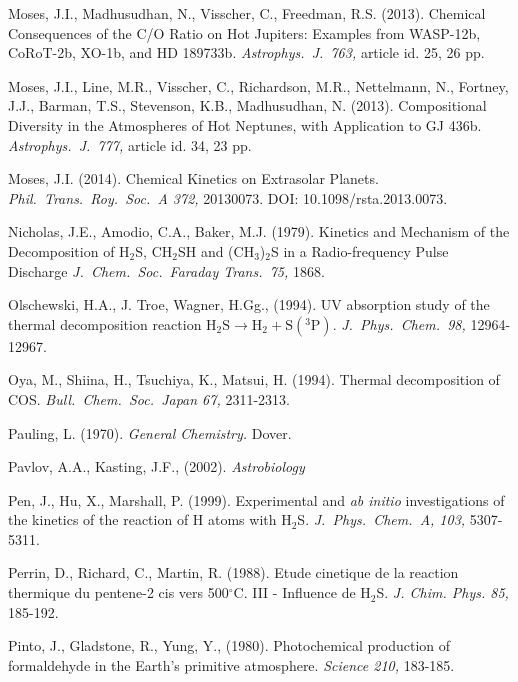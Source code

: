 \documentclass[preprint]{aastex6}
\newcounter{reaction}
\begin{document}
\begin{thebibliography}{00}
Moses, J.I., Madhusudhan, N., Visscher, C., Freedman, R.S. (2013).
Chemical Consequences of the C/O Ratio on Hot Jupiters: Examples from WASP-12b, CoRoT-2b, XO-1b, and HD 189733b.
{\em Astrophys.\ J.\ 763,} article id. 25, 26 pp.

Moses, J.I., Line, M.R., Visscher, C., Richardson, M.R., Nettelmann, N., Fortney, J.J., Barman, T.S., Stevenson, K.B., Madhusudhan, N. (2013).
Compositional Diversity in the Atmospheres of Hot Neptunes, with Application to GJ 436b.
{\em Astrophys.\ J.\ 777,} article id. 34, 23 pp.

 Moses, J.I. (2014).
 Chemical Kinetics on Extrasolar Planets. 
 {\em Phil.\ Trans.\ Roy.\ Soc.\ A 372,} 20130073. DOI: 10.1098/rsta.2013.0073.
 
 Nicholas, J.E., Amodio, C.A., Baker, M.J. (1979).
Kinetics and Mechanism of the Decomposition of H$_2$S, CH$_2$SH and (CH$_3$)$_2$S in a Radio-frequency Pulse Discharge
{\em J.\ Chem.\ Soc.\ Faraday Trans.\ 75,} 1868.
 
Olschewski, H.A., J. Troe, Wagner, H.Gg., (1994).
UV absorption study of the thermal decomposition reaction $\mathrm{H}_2\mathrm{S} \rightarrow \mathrm{H}_2 + \mathrm{S}(^3\mathrm{P})$.
{\em J.\ Phys.\ Chem.\ 98,} 12964-12967.
 
Oya, M., Shiina, H., Tsuchiya, K., Matsui, H. (1994).
Thermal decomposition of COS.
{\em Bull.\ Chem.\ Soc.\ Japan 67,} 2311-2313.

Pauling, L. (1970).
{\em General Chemistry.} Dover.

Pavlov, A.A., Kasting, J.F., (2002).
{\em Astrobiology}

Pen, J., Hu, X., Marshall, P. (1999). 
Experimental and {\it ab initio} investigations of the kinetics of the reaction of H atoms with H$_2$S.
{\em J.\ Phys.\ Chem.\ A, 103,} 5307-5311.

Perrin, D., Richard, C., Martin, R. (1988). Etude cinetique de la reaction thermique du pentene-2 cis vers 500$^{\circ}$C. III - Influence de H$_2$S. {\em  J. Chim. Phys. 85,} 185-192.

Pinto, J., Gladstone, R., Yung, Y., (1980).
Photochemical production of formaldehyde in the Earth's primitive atmosphere. 
{\em Science 210,} 183-185.


\end{thebibliography}
\end{document}
